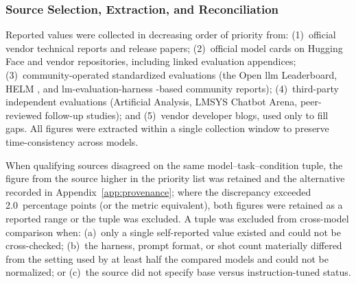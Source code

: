 \begin{table}[ht]
\centering
\caption{Hardware configurations covered by the review. For each reviewed model, reported performance on a configuration was included where publicly available.}
\label{tab:hardware_configs}
\footnotesize{}
\end{table}

\subsubsection{Source Selection, Extraction, and Reconciliation}
\label{subsec:reported_sources}
Reported values were collected in decreasing order of priority from: (1)~official
vendor technical reports and release papers; (2)~official model cards on Hugging
Face and vendor repositories, including linked evaluation appendices;
(3)~community-operated standardized evaluations (the Open \gls{llm} Leaderboard, HELM
\citep{liang2023helm}, and lm-evaluation-harness \citep{gao2023harness}-based
community reports); (4)~third-party independent evaluations (Artificial Analysis,
LMSYS Chatbot Arena, peer-reviewed follow-up studies); and (5)~vendor developer
blogs, used only to fill gaps. All figures were extracted within a single
collection window to preserve time-consistency across models.

When qualifying sources disagreed on the same model--task--condition tuple, the
figure from the source higher in the priority list was retained and the
alternative recorded in Appendix~\ref{app:provenance}; where the discrepancy
exceeded 2.0~percentage points (or the metric equivalent), both figures were
retained as a reported range or the tuple was excluded. A tuple was excluded from
cross-model comparison when: (a)~only a single self-reported value existed and
could not be cross-checked; (b)~the harness, prompt format, or shot count
materially differed from the setting used by at least half the compared models
and could not be normalized; or (c)~the source did not specify base versus
instruction-tuned status.

